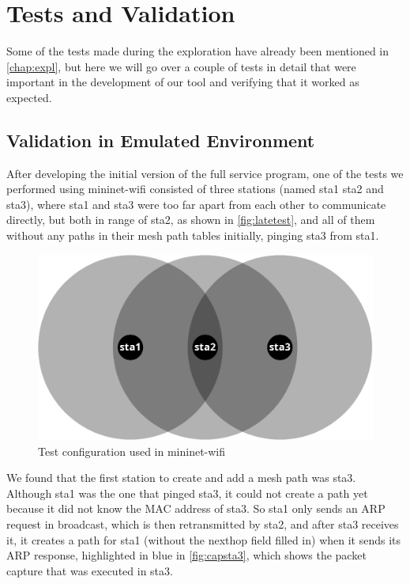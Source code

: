 \chapter{Tests and Validation}\label{chap:tests}

Some of the tests made during the exploration have already been mentioned in
\autoref{chap:expl}, but here we will go over a couple of tests in detail that
were important in the development of our tool and verifying that it worked as
expected.

\section{Validation in Emulated Environment}

After developing the initial version of the full service program, one of the
tests we performed using mininet-wifi consisted of three stations (named sta1
sta2 and sta3), where sta1 and sta3 were too far apart from each other to
communicate directly, but both in range of sta2, as shown in
\autoref{fig:latetest}, and all of them without any paths in their mesh path
tables initially, pinging sta3 from sta1.

\begin{figure}[htb]
   \centering
   \includegraphics[scale=.3]{latetest}
   \caption{Test configuration used in mininet-wifi}\label{fig:latetest}
\end{figure}

We found that the first station to create and add a mesh path was sta3. Although
sta1 was the one that pinged sta3, it could not create a path yet because it did
not know the \ac{MAC} address of sta3. So sta1 only sends an \ac{ARP} request in
broadcast, which is then retransmitted by sta2, and after sta3 receives it, it
creates a path for sta1 (without the nexthop field filled in) when it sends its
\ac{ARP} response, highlighted in blue in \autoref{fig:capsta3}, which shows the
packet capture that was executed in sta3.

